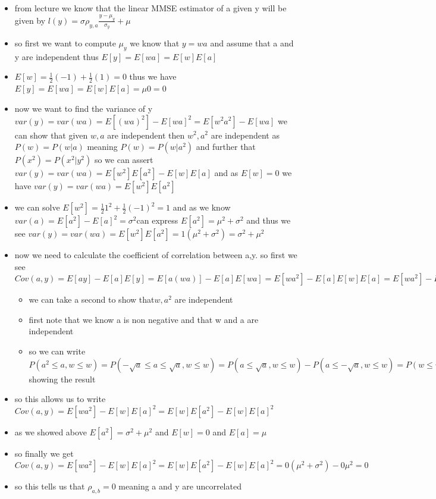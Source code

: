 \documentclass[12pt,twoside]{article}
\begin{document}
\begin{enumerate}
\begin{enumerate}
\begin{itemize}
    \item from lecture we know that the linear MMSE estimator of a given y will be given by $l(y)=\sigma\rho_{y,a}\frac{y-\mu_{y}}{\sigma_{y}}+\mu$
    
    
    \item so first we want to compute $\mu_{y}$ we know that $y=wa$ and assume that a and y are independent thus $E[y]=E[wa]=E[w]E[a]$ 
    \item $E[w]=\frac{1}{2}(-1)+\frac{1}{2}(1)=0$  thus we have $E[y]=E[wa]=E[w]E[a]=\mu0=0$
    \item now we want to find the variance of y $var(y)=var(wa)=E[(wa)^2]-E[wa]^2=E[w^2a^2]-E[wa]$ we can show that given $w,a$ are independent then $w^2,a^2$ are independent as $P(w)=P(w|a)$ meaning $P(w)=P(w|a^2)$ and further that  $P(x^2)=P(x^2|y^2)$ so we can assert  $var(y)=var(wa)=E[w^2]E[a^2]-E[w]E[a]$ and as $E[w]=0$ we have $var(y)=var(wa)=E[w^2]E[a^2]$ 
    \item we can solve $E[w^2]=\frac{1}{2}1^2+\frac{1}{2}(-1)^2=1$ and as we know $var(a)=E[a^2]-E[a]^2=\sigma^2$can express $E[a^2]=\mu^2+\sigma^2$ and thus we see $var(y)=var(wa)=E[w^2]E[a^2]=1(\mu^2+\sigma^2)=\sigma^2+\mu^2$
    \item now we need to calculate the coefficient of correlation between a,y. so first we see $Cov(a,y)=E[ay]-E[a]E[y]=E[a(wa)]-E[a]E[wa]=E[wa^2]-E[a]E[w]E[a]=E[wa^2]-E[w]E[a]^2$
    \begin{itemize}
        \item we can take a second to show that$w,a^2$ are independent 
        \item first note that we know a is non negative and that w and a are independent
        \item so we can write $P(a^2\leq a, w\leq w)=P(-\sqrt{a}\leq a \leq \sqrt{a}, w\leq w)=P(a\leq \sqrt{a}, w\leq w)-P(a\leq -\sqrt{a}, w\leq w)=P(w\leq w)P(a\leq \sqrt{a})-P(a\leq -\sqrt{a})P(w\leq w)=P(w\leq w)(P(a\leq \sqrt{a})-P(a\leq -\sqrt{a}))=(a^2\leq a)P(w\leq w)$ showing the result
    \end{itemize}
    \item so this allows us to write $Cov(a,y)=E[wa^2]-E[w]E[a]^2=E[w]E[a^2]-E[w]E[a]^2$
    \item as we showed above $E[a^2]=\sigma^2+\mu^2$ and $E[w]=0$ and $E[a]=\mu$ 
    \item so finally we get$Cov(a,y)=E[wa^2]-E[w]E[a]^2=E[w]E[a^2]-E[w]E[a]^2=0(\mu^2+\sigma^2)-0\mu^2=0$
    \item so this tells us that  $\rho_{a,b}=0$ meaning a and y are uncorrelated

\end{itemize}
\end{enumerate}
\end{enumerate}
\end{document}
